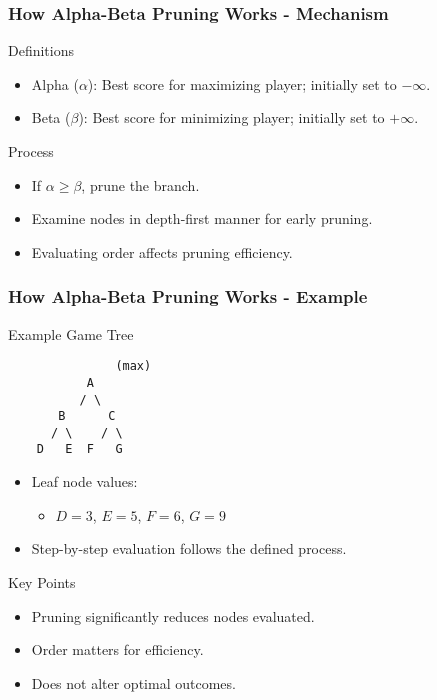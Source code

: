 \documentclass[aspectratio=169]{beamer}
\begin{document}
\begin{frame}[fragile]
    \frametitle{How Alpha-Beta Pruning Works - Mechanism}
    \begin{block}{Definitions}
        \begin{itemize}
            \item Alpha ($\alpha$): Best score for maximizing player; initially set to $-\infty$.
            \item Beta ($\beta$): Best score for minimizing player; initially set to $+\infty$.
        \end{itemize}
    \end{block}
    
    \begin{block}{Process}
        \begin{itemize}
            \item If $\alpha \geq \beta$, prune the branch.
            \item Examine nodes in depth-first manner for early pruning.
            \item Evaluating order affects pruning efficiency.
        \end{itemize}
    \end{block}
\end{frame}

\begin{frame}[fragile]
    \frametitle{How Alpha-Beta Pruning Works - Example}
    \begin{block}{Example Game Tree}
    \begin{lstlisting}
               (max)
           A        
          / \
       B      C
      / \    / \
    D   E  F   G
    \end{lstlisting}
    \end{block}
    
    \begin{itemize}
        \item Leaf node values:
            \begin{itemize}
                \item $D = 3$, $E = 5$, $F = 6$, $G = 9$
            \end{itemize}
        \item Step-by-step evaluation follows the defined process.
    \end{itemize}
    
    \begin{block}{Key Points}
        \begin{itemize}
            \item Pruning significantly reduces nodes evaluated.
            \item Order matters for efficiency.
            \item Does not alter optimal outcomes.
        \end{itemize}
    \end{block}
\end{frame}
\end{document}
